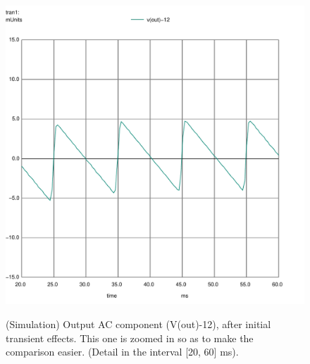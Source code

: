       \begin{figure}[h] \centering
        \includegraphics[height=12cm]{spice_t3_2_zoom.pdf}
        \caption{(Simulation) Output AC component (V(out)-12), after initial transient effects. This one is
        zoomed in so as to make the comparison easier. (Detail in the interval [20, 60] ms).}
        \label{fig:comp2_2}
      \end{figure}

\newpage




